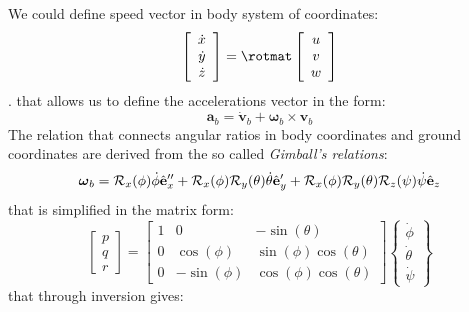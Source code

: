 We could define speed vector in body system of coordinates:
\begin{equation}
\vettore{\dot{x} \\ \dot{y} \\ \dot{z}} = \rotmat \vettore{u\\v\\w}
\end{equation}
.  that allows us to define the accelerations vector in the form:
\begin{equation}
\mathbf{a}_b = \dot{\mathbf{v}}_b + \boldsymbol{\omega}_b \times \mathbf{v}_b
\end{equation}
The relation that connects angular ratios in body coordinates and ground coordinates are derived from the so called \emph{Gimball's relations}:
\begin{equation}
\boldsymbol{\omega}_b = \mathcal{R}_x (\phi) \dot{\phi} \hat{\mathbf{e}}''_x + \mathcal{R}_x(\phi) \mathcal{R}_y(\theta) \dot{\theta} \hat{\mathbf{e}}'_y + \mathcal{R}_x(\phi) \mathcal{R}_y(\theta) \mathcal{R}_z(\psi) \dot{\psi} \hat{\mathbf{e}}_z
\end{equation}
that is simplified in the matrix form:
\begin{equation*}
\left[ \begin{array}{c} p \\ q \\ r \end{array} \right] = \left[ \begin{array}{ccc}
 1 & 0 & -\sin(\theta) \\
 0 & \cos(\phi) & \sin(\phi)\cos(\theta) \\
 0 & -\sin(\phi) & \cos(\phi)\cos(\theta)
 \end{array} \right] \left\{ \begin{array}{c} \dot{\phi} \\ \dot{\theta} \\ \dot{\psi} \end{array} \right\}
\end{equation*}
that through inversion gives:
